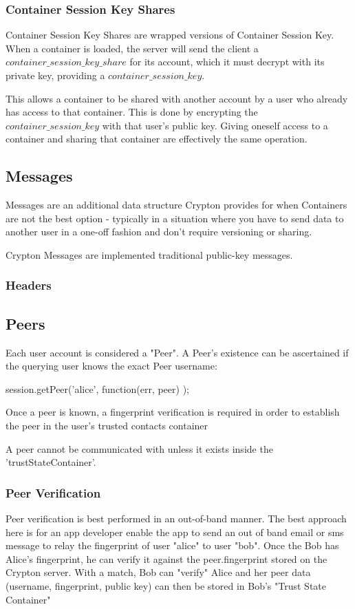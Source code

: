 \documentclass[conference]{IEEEtran}
\begin{document}
\subsubsection{Container Session Key Shares}
Container Session Key Shares are wrapped versions of Container Session Key.
When a container is loaded, the server will send the client a 
\(container\_session\_key\_share\) for its account, which it must decrypt with
its private key, providing a \(container\_session\_key\).

This allows a container to be shared with another account by a user who
already has access to that container. This is done by encrypting the
\(container\_session\_key\) with that user's public key.
Giving oneself access to a container and sharing that container are effectively
the same operation.

\subsection{Messages}
Messages are an additional data structure Crypton provides for when Containers
are not the best option - typically in a situation where you have to send
data to another user in a one-off fashion and don't require versioning or
sharing.

Crypton Messages are implemented traditional public-key messages.

\subsubsection{Headers}

\subsection{Peers}
Each user account is considered a "Peer". A Peer's existence can be ascertained if the querying user knows the exact Peer username:

session.getPeer('alice', function(err, peer) {});

Once a peer is known, a fingerprint verification is required in order to establish the peer in the user's trusted contacts container\cite{trustStateContainer}

A peer cannot be communicated with unless it exists inside the 'trustStateContainer'.

\subsubsection{Peer Verification}
Peer verification is best performed in an out-of-band manner. The best approach here is for an app developer enable the app to send an out of band email or sms message to relay the fingerprint of user "alice" to user "bob". Once the Bob has Alice's fingerprint, he can verify it against the peer.fingerprint stored on the Crypton server. With a match, Bob can "verify" Alice and her peer data (username, fingerprint, public key) can then be stored in Bob's "Trust State Container"\cite{trustStateContainer}
\end{document}
